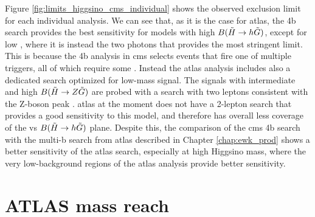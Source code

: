 Figure \ref{fig:limits_higgsino_cms_individual} shows the observed exclusion limit for each individual analysis. 
We can see that, as it is the case for \gls{atlas}, the 4b search \cite{Sirunyan:2017obz} provides the 
best sensitivity for models with high $B(\tilde{H}\rightarrow h \tilde{G})$, except for low \mhino, where 
it is instead the two photons \cite{Sirunyan:2017eie} that provides the most stringent limit.
This is because the 4b analysis in \gls{cms} selects events that fire one of multiple triggers, 
all of which require some \met. 
Instead the \gls{atlas} analysis 
includes also a dedicated search optimized for low-mass signal.
The signals with intermediate and high $B(\tilde{H}\rightarrow Z \tilde{G})$ are probed with a 
search with two leptons consistent with the Z-boson peak \cite{Sirunyan:2017qaj}. 
\gls{atlas} at the moment does not have a 2-lepton search that provides a good sensitivity to this model,
and therefore has overall less coverage of the \mhino vs $B(\tilde{H}\rightarrow h \tilde{G})$ plane.
Despite this, the comparison of the \gls{cms} 4b search with the multi-b search from \gls{atlas}
described in Chapter \ref{chap:ewk_prod} shows a better sensitivity of the \gls{atlas} search, 
especially at high Higgsino mass,
where the very low-background regions of the \gls{atlas} analysis provide better sensitivity. 




\FloatBarrier


\section{ATLAS mass reach}

